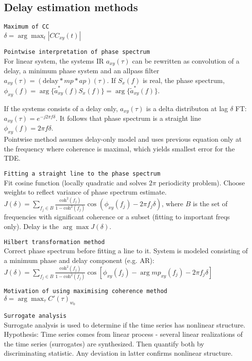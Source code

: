 \subsection{Delay estimation methods}
\verb!Maximum of CC!\\
$\delta = \arg\max_t|CC_{xy}(t)|$ \vs

\verb!Pointwise interpretation of phase spectrum!\\
For linear system, the systems IR $a_{xy}(\tau)$ can be rewritten as convolution of a delay, a minimum phase system and an allpass filter $a_{xy}(\tau)=(\text{delay} * mp * ap)(\tau)$. If $S_x(f)$ is real, the phase spectrum,  $\phi_{xy}(f) = \arg \{\tilde{a}^*_{xy}(f) S_x(f)\} = \arg \{\tilde{a}^*_{xy}(f)\}$.\vs

If the systems consists of a delay only, $a_{xy}(\tau)$ is a delta distributon at lag $\delta$ \arr FT: $a_{xy}(\tau) = e^{-j2\pi f \delta}$. It follows that phase spectrum is a straight line $\phi_{xy}(f) = 2\pi f\delta$. \\
Pointwise method assumes delay-only model and uses previous equation only at the frequency where coherence is maximal, which yields smallest error for the TDE.\vs

\verb!Fitting a straight line to the phase spectrum!\\
Fit cosine function (locally quadratic and solves $2\pi$ periodicity problem). Choose weights to reflect variance of phase spectrum estimate.\\
$J(\delta) = \sum_{f_j\in B} \frac{\text{coh}^2(f_j)}{1-\text{coh}^2(f_j)} \cos(\phi_{xy}(f_j)-2\pi f_j \delta)$, where $B$ is the set of frequencies with significant coherence or a subset (fitting to important freqs only). Delay is the $\arg\max J(\delta)$.\vs

\verb!Hilbert transformation method!\\
Correct phase spectrum before fitting a line to it. System is modeled consisting of a minimum phase and delay component (e.g. AR):
$J(\delta) = \sum_{f_j\in B} \frac{\text{coh}^2(f_j)}{1-\text{coh}^2(f_j)} \cos[\phi_{xy}(f_j) - \arg mp_{xy}(f_j) - 2\pi f_j \delta]$

\verb!Motivation of using maximising coherence method!\\
$\delta = \arg\max_{\tau} C'(\tau)_{w_0}$\vs

\verb!Surrogate analysis!\\
Surrogate analysis is used to determine if the time series has nonlinear structure. Hypothesis: Time series comes from linear process - several linear realizations of the time series (surrogates) are synthesized. Then quantify both by discriminating statistic. Any deviation in latter confirms nonlinear structure.\vs


